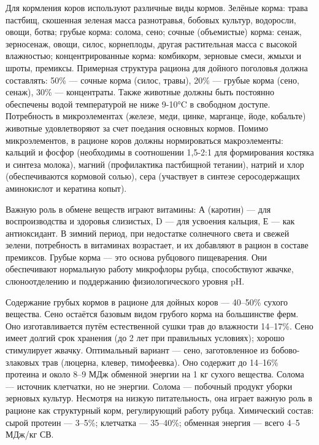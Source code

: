 Для кормления коров используют различные виды кормов. Зелёные корма: трава пастбищ, скошенная зеленая масса разнотравья, бобовых культур, водоросли, овощи, ботва; грубые корма: солома, сено; сочные (объемистые) корма: сенаж, зерносенаж, овощи, силос, корнеплоды, другая растительная масса с высокой влажностью; концентрированные корма: комбикорм, зерновые смеси, жмыхи и шроты, премиксы. Примерная структура рациона для дойного поголовья должна составлять: 50\% --- сочные корма (силос, травы), 20\% --- грубые корма (сено, сенаж), 30\% — концентраты. Также животные должны быть постоянно обеспечены водой температурой не ниже 9-10°C в свободном доступе.
Потребность в  микроэлементах (железе, меди, цинке, марганце, йоде, кобальте) животные удовлетворяют за счет поедания основных кормов. 
Помимо микроэлементов, в рационе коров должны нормироваться макроэлементы: кальций и фосфор (необходимы в соотношении 1,5-2:1 для формирования костяка и синтеза молока), магний (профилактика пастбищной тетании), натрий и хлор (обеспечиваются кормовой солью), сера (участвует в синтезе серосодержащих аминокислот и кератина копыт).

\cite{gusarov2024}
Важную роль в обмене веществ играют витамины: А (каротин) — для воспроизводства и здоровья слизистых, D — для усвоения кальция, Е — как антиоксидант. В зимний период, при недостатке солнечного света и свежей зелени, потребность в витаминах возрастает, и их добавляют в рацион в составе премиксов. \cite{gusarov2024}
Грубые корма --- это основа рубцового пищеварения. Они обеспечивают нормальную работу микрофлоры рубца, способствуют жвачке, слюноотделению и поддержанию физиологического уровня pH. 

Содержание грубых кормов в рационе для дойных коров --- 40–50\% сухого вещества.
Сено остаётся базовым видом грубого корма на большинстве ферм. Оно изготавливается путём естественной сушки трав до влажности 14–17\%.
Сено имеет долгий срок хранения (до 2 лет при правильных условиях); хорошо стимулирует жвачку.
Оптимальный вариант --- сено, заготовленное из бобово-злаковых трав (люцерна, клевер, тимофеевка). Оно содержит до 14–16\% протеина и около 8–9 МДж обменной энергии на 1 кг сухого вещества. Солома --- источник клетчатки, но не энергии. Солома --- побочный продукт уборки зерновых культур. Несмотря на низкую питательность, она играет важную роль в рационе как структурный корм, регулирующий работу рубца. Химический состав: сырой протеин — 3–5\%; клетчатка — 35–40\%; обменная энергия — всего 4–5 МДж/кг СВ.
